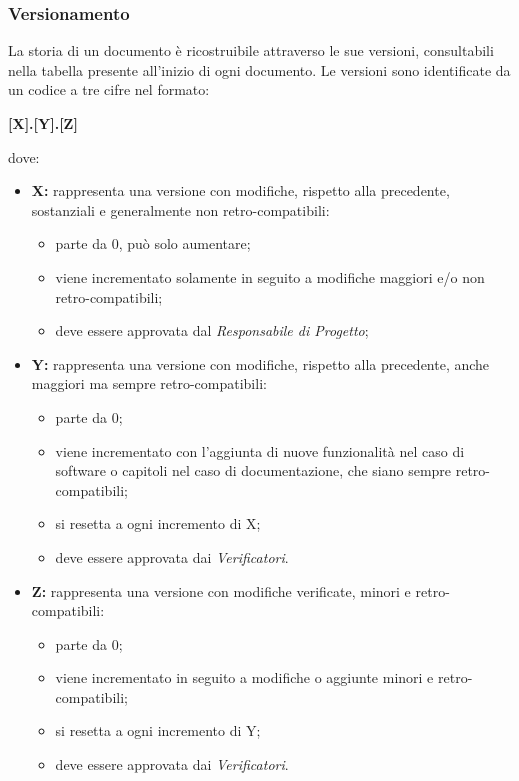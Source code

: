 \subsubsection{Versionamento}
La storia di un documento è ricostruibile attraverso le sue versioni, consultabili nella tabella presente all'inizio di ogni documento. Le versioni sono identificate da un codice a tre cifre nel formato:
\begin{center}
    \textbf{\large [X].[Y].[Z]}\\
\end{center}
dove:
\begin{itemize}

    \item \textbf{\large X:} rappresenta una versione con modifiche, rispetto alla precedente, sostanziali e generalmente non retro-compatibili:
          \begin{itemize}
              \item parte da 0, può solo aumentare;
              \item viene incrementato solamente in seguito a modifiche maggiori e/o non retro-compatibili;
              \item deve essere approvata dal \textit{Responsabile di Progetto};
          \end{itemize}
    \item \textbf{\large Y:} rappresenta una versione con modifiche, rispetto alla precedente, anche maggiori ma sempre retro-compatibili:
          \begin{itemize}
              \item parte da 0;
              \item viene incrementato con l'aggiunta di nuove funzionalità nel caso di software o capitoli nel caso di documentazione, che siano sempre retro-compatibili;
              \item si resetta a ogni incremento di X;
              \item deve essere approvata dai \textit{Verificatori}.
          \end{itemize}
    \item \textbf{\large Z:} rappresenta una versione con modifiche verificate, minori e retro-compatibili:
          \begin{itemize}
              \item parte da 0;
              \item viene incrementato in seguito a modifiche o aggiunte minori e retro-compatibili;
              \item si resetta a ogni incremento di Y;
              \item deve essere approvata dai \textit{Verificatori}.
          \end{itemize}

\end{itemize}
